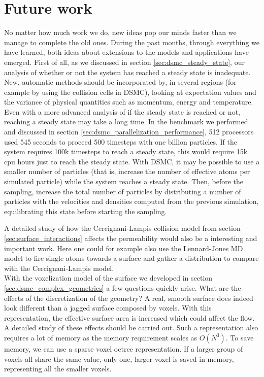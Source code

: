 \section{Future work}
No matter how much work we do, new ideas pop our minds faster than we manage to complete the old ones. During the past months, through everything we have learned, both ideas about extensions to the models and applications have emerged. First of all, as we discussed in section \ref{sec:dsmc_steady_state}, our analysis of whether or not the system has reached a steady state is inadequate. New, automatic methods should be incorporated by, in several regions (for example by using the collision cells in DSMC), looking at expectation values and the variance of physical quantities such as momentum, energy and temperature. Even with a more advanced analysis of if the steady state is reached or not, reaching a steady state may take a long time. In the benchmark we performed and discussed in section \ref{sec:dsmc_parallelization_performance}, 512 processors used 545 seconds to proceed 500 timesteps with one billion particles. If the system requires 100k timesteps to reach a steady state, this would require 15k cpu hours just to reach the steady state. With DSMC, it may be possible to use a smaller number of particles (that is, increase the number of effective atoms per simulated particle) while the system reaches a steady state. Then, before the sampling, increase the total number of particles by distributing a number of particles with the velocities and densities computed from the previous simulation, equilibrating this state before starting the sampling.

A detailed study of how the Cercignani-Lampis collision model from section \ref{sec:surface_interactions} affects the permeability would also be a interesting and important work. Here one could for example also use the Lennard-Jones MD model to fire single atoms towards a surface and gather a distribution to compare with the Cercignani-Lampis model.\\
With the voxelization model of the surface we developed in section \ref{sec:dsmc_complex_geometries} a few questions quickly arise. What are the effects of the discretization of the geometry? A real, smooth surface does indeed look different than a jagged surface composed by voxels. With this representation, the effective surface area is increased which could affect the flow. A detailed study of these effects should be carried out. Such a representation also requires a lot of memory as the memory requirement scales as $O(N^3)$. To save memory, we can use a sparse voxel octree representation. If a larger group of voxels all share the same value, only one, larger voxel is saved in memory, representing all the smaller voxels.

